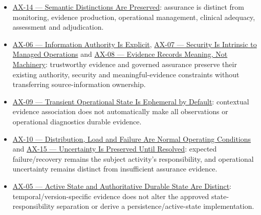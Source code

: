 \begin{itemize}

\item
\href{https://github.com/fhirfactory/harmonia/blob/98410db60155198a75f74c79d98060070209faa1/docs/markdown/governance/architectural-axioms.md\#ax-14}{AX-14 — Semantic Distinctions Are Preserved}: assurance is distinct from monitoring, evidence production, operational management, clinical adequacy, assessment and adjudication.



\item
\href{https://github.com/fhirfactory/harmonia/blob/98410db60155198a75f74c79d98060070209faa1/docs/markdown/governance/architectural-axioms.md\#ax-06}{AX-06 — Information Authority Is Explicit}, \href{https://github.com/fhirfactory/harmonia/blob/98410db60155198a75f74c79d98060070209faa1/docs/markdown/governance/architectural-axioms.md\#ax-07}{AX-07 — Security Is Intrinsic to Managed Operations} and \href{https://github.com/fhirfactory/harmonia/blob/98410db60155198a75f74c79d98060070209faa1/docs/markdown/governance/architectural-axioms.md\#ax-08}{AX-08 — Evidence Records Meaning, Not Machinery}: trustworthy evidence and governed assurance preserve their existing authority, security and meaningful-evidence constraints without transferring source-information ownership.



\item
\href{https://github.com/fhirfactory/harmonia/blob/98410db60155198a75f74c79d98060070209faa1/docs/markdown/governance/architectural-axioms.md\#ax-09}{AX-09 — Transient Operational State Is Ephemeral by Default}: contextual evidence association does not automatically make all observations or operational diagnostics durable evidence.



\item
\href{https://github.com/fhirfactory/harmonia/blob/98410db60155198a75f74c79d98060070209faa1/docs/markdown/governance/architectural-axioms.md\#ax-10}{AX-10 — Distribution, Load and Failure Are Normal Operating Conditions} and \href{https://github.com/fhirfactory/harmonia/blob/98410db60155198a75f74c79d98060070209faa1/docs/markdown/governance/architectural-axioms.md\#ax-15}{AX-15 — Uncertainty Is Preserved Until Resolved}: expected failure/\allowbreak{}recovery remains the subject activity's responsibility, and operational uncertainty remains distinct from insufficient assurance evidence.



\item
\href{https://github.com/fhirfactory/harmonia/blob/98410db60155198a75f74c79d98060070209faa1/docs/markdown/governance/architectural-axioms.md\#ax-05}{AX-05 — Active State and Authoritative Durable State Are Distinct}: temporal/\allowbreak{}version-specific evidence does not alter the approved state-responsibility separation or derive a persistence/\allowbreak{}active-state implementation.



\end{itemize}
\label{rad:assurance-strategy:26}
